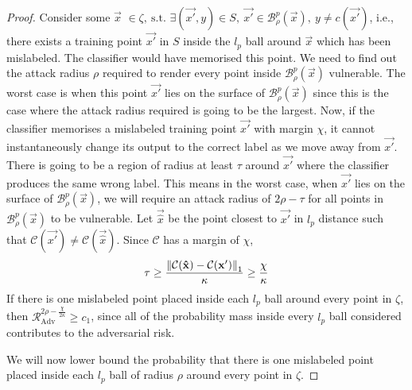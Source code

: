 \documentclass{ociamthesis}
\begin{document}
\begin{proof}
Consider some $\vec{x}$
$
\in \zeta, ~\text{s.t. } \exists (\vec{x'}, y) \in S,~\vec{x'}
\in \mathcal{B}_\rho^p(\vec{x}),~y \neq c(\vec{x'})
$,
i.e., there exists a training point $\vec{x'}$ in $S$ inside the $l_p$ ball
around $\vec{x}$ which has been mislabeled. The classifier would have memorised
this point. We need to find out the attack radius $\rho$ required to render
every point inside $\mathcal{B}_\rho^p(\vec{x})$ vulnerable. The worst case is
when this point $\vec{x'}$ lies on the surface of $\mathcal{B}_\rho^p(\vec{x})$
since this is the case where the attack radius required is going to be the
largest. Now, if the classifier memorises a mislabeled training point $\vec{x'}$
with margin $\chi$, it cannot instantaneously change its output to the correct
label as we move away from $\vec{x'}$. There is going to be a region of radius
at least $\tau$ around $\vec{x'}$ where the classifier produces the same wrong
label. This means in the worst case, when $\vec{x'}$ lies on the surface of
$\mathcal{B}_\rho^p(\vec{x})$, we will require an attack radius of $2\rho-\tau$
for all points in $\mathcal{B}_\rho^p(\vec{x})$ to be vulnerable. Let
$\vec{\hat{x}}$ be the point closest to $\vec{x'}$ in $l_p$ distance such that
$\mathcal{C}(\vec{x'}) \neq \mathcal{C}(\vec{\hat{x}})$. Since $\mathcal{C}$ has
a margin of $\chi$,
\begin{equation*}
    \tau \geq \frac{\mathrm{\left\lVert\mathcal{C}({\mathbf{\hat{x}}}) - \mathcal{C}({\mathbf{x'}})
                \right\rVert}_1}
                    {\kappa}
        \geq
        \frac{\chi}{\kappa}
\end{equation*}
If there is one mislabeled point placed inside each $l_p$ ball around every
point in $\zeta$, then $\mathcal{R}_{\text{Adv}}^{2\rho-\frac{\chi}{2\kappa}}
\geq c_1$, since all of the probability mass inside every $l_p$ ball considered
contributes to the adversarial risk.

We will now lower bound the probability that there is one mislabeled point
placed inside each $l_p$ ball of radius $\rho$ around every point in $\zeta$.


\end{proof}
\end{document}
